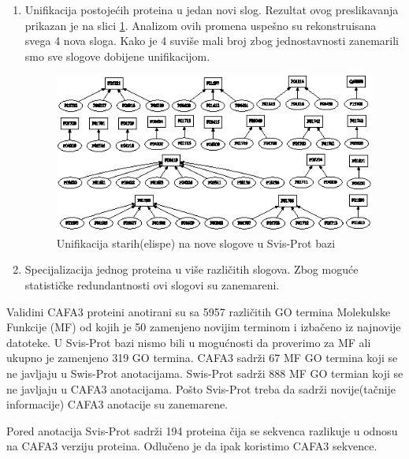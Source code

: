 \begin{enumerate}
  \item Unifikacija postojećih proteina u jedan novi slog. Rezultat ovog
    preslikavanja prikazan je na slici \ref{fig:unifikacija_slogova}. Analizom
    ovih promena uspešno su rekonstruisana  svega 4 nova sloga. Kako je 4
    suviše mali broj zbog jednostavnosti zanemarili smo sve slogove dobijene
    unifikacijom.

  \begin{figure}[th]
  \centering
  \includegraphics[scale=2]{plots/unifikacija_slogova2.eps}
  \decoRule
  \caption{Unifikacija starih(elispe) na nove slogove u Svis-Prot bazi}
  \label{fig:unifikacija_slogova}
  \end{figure}

  \item Specijalizacija jednog proteina u više različitih slogova.  Zbog moguće
    statističke redundantnosti ovi slogovi su zanemareni.
\end{enumerate}





Validini CAFA3 proteini anotirani su sa  5957 različitih GO termina Molekulske
Funkcije (MF) od kojih je 50 zamenjeno novijim terminom i izbačeno iz najnovije
 datoteke. U Svis-Prot bazi nismo bili u mogućnosti da proverimo
za MF ali ukupno je zamenjeno 319 GO termina.
CAFA3 sadrži 67 MF GO termina koji se ne javljaju u Swis-Prot anotacijama.
Swis-Prot sadrži 888 MF GO termian koji se ne javljaju u CAFA3 anotacijama.
Pošto Svis-Prot treba da sadrži novije(tačnije informacije) CAFA3 anotacije
su zanemarene.

Pored anotacija Svis-Prot sadrži 194 proteina čija se sekvenca razlikuje u
odnosu na CAFA3 verziju proteina. Odlučeno je da ipak koristimo CAFA3 sekvence.


